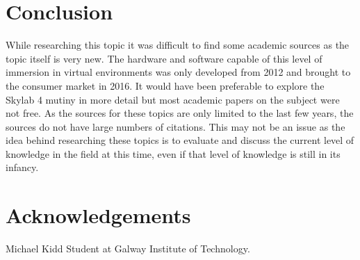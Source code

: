 \documentclass[10pt,journal,compsoc]{IEEEtran}
\begin{document}
	\section{Conclusion}
	While researching this topic it was difficult to find some academic sources as the topic itself is very new. The hardware and software capable of this level of immersion in virtual environments was only developed from 2012 and brought to the consumer market in 2016. It would have been preferable to explore the Skylab 4 mutiny in more detail but most academic papers on the subject were not free. As the sources for these topics are only limited to the last few years, the sources do not have large numbers of citations. This may not be an issue as the idea behind researching these topics is to evaluate and discuss the current level of knowledge in the field at this time, even if that level of knowledge is still in its infancy.

	\section{Acknowledgements}

	
	\begin{IEEEbiography}{Michael Kidd}
	Student at Galway Institute of Technology.
		
	\end{IEEEbiography}
\end{document}
